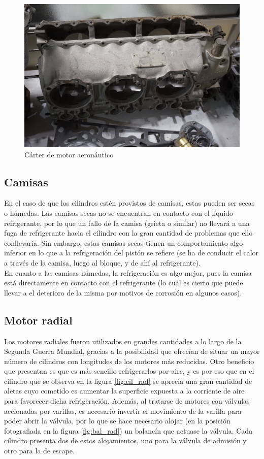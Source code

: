 \begin{figure}[H]
	\centering
	\includegraphics[width=0.6\linewidth]{Figures/02/m3/bloq_boxer.jpg}
	\caption{Cárter de motor aeronáutico}
	\label{fig:crankcase}
\end{figure}

\subsection{Camisas} \label{ss:jacket}

En el caso de que los cilindros estén provistos de camisas, estas pueden ser secas o húmedas. Las camisas secas no se encuentran en contacto con el líquido refrigerante, por lo que un fallo de la camisa (grieta o similar) no llevará a una fuga de refrigerante hacia el cilindro con la gran cantidad de problemas que ello conllevaría. Sin embargo, estas camisas secas tienen un comportamiento algo inferior en lo que a la refrigeración del pistón se refiere (se ha de conducir el calor a través de la camisa, luego al bloque, y de ahí al refrigerante).\\

En cuanto a las camisas húmedas, la refrigeración es algo mejor, pues la camisa está directamente en contacto con el refrigerante (lo cuál es cierto que puede llevar a el deterioro de la misma por motivos de corrosión en algunos casos).

\subsection{Motor radial} \label{ss:cil_rad}

Los motores radiales fueron utilizados en grandes cantidades a lo largo de la Segunda Guerra Mundial, gracias a la posibilidad que ofrecían de situar un mayor número de cilindros con longitudes de los motores más reducidas. Otro beneficio que presentan es que es más sencillo refrigerarlos por aire, y es por eso que en el cilindro que se observa en la figura \ref{fig:cil_rad} se aprecia una gran cantidad de aletas cuyo cometido es aumentar la superficie expuesta a la corriente de aire para favorecer dicha refrigeración. Además, al tratarse de motores con válvulas accionadas por varillas, es necesario invertir el movimiento de la varilla para poder abrir la válvula, por lo que se hace necesario alojar (en la posición fotografiada en la figura \ref{fig:bal_rad}) un balancín que actuase la válvula. Cada cilindro presenta dos de estos alojamientos, uno para la válvula de admisión y otro para la de escape.

